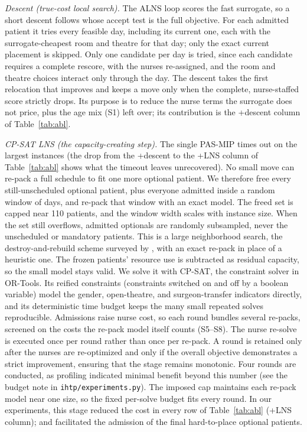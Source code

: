 \documentclass[11pt]{article}
\newcommand{\Sc}[1]{\textsf{S#1}}
\begin{document}
	\emph{Descent (true-cost local search).} The ALNS loop scores the fast surrogate, so a short
	descent follows whose accept test is the full objective. For each admitted patient it tries every feasible day, including its current one, each with the
	surrogate-cheapest room and theatre for that day; only the exact current placement is skipped. Only one candidate per day is tried, since each candidate requires a complete
	rescore, with the nurses re-assigned, and the room and theatre choices interact only through the day. The descent takes the
	first relocation that improves and keeps a move only when the complete, nurse-staffed score
	strictly drops. Its purpose is to reduce the nurse terms the surrogate does not price, plus the age mix (\Sc1) left over; its contribution is the +descent column of Table~\ref{tab:abl}.
	
	\emph{CP-SAT LNS (the capacity-creating step).} The single PAS-MIP times out on the largest
	instances (the drop from the +descent to the +LNS column of Table~\ref{tab:abl} shows what the timeout leaves unrecovered). No small move can re-pack a full schedule to fit one more optional patient. We
	therefore free every still-unscheduled optional patient, plus everyone admitted inside a random
	window of days, and re-pack that window with an exact model. The freed set is capped near 110 patients, and the window width scales with instance size. When the set still overflows, admitted optionals are randomly subsampled, never the unscheduled or mandatory patients. This is a large neighborhood search, the
	destroy-and-rebuild scheme surveyed by \citet{pisinger2010}, with an exact re-pack in place of a
	heuristic one. The frozen patients' resource use is subtracted as
	residual capacity, so the small model stays valid. We solve it with CP-SAT, the constraint solver
	in OR-Tools. Its reified constraints (constraints switched on and off by a boolean variable) model the
	gender, open-theatre, and surgeon-transfer indicators directly, and its deterministic time budget keeps the many small repeated solves reproducible. Admissions raise nurse cost, so each round bundles several re-packs, screened on the costs the re-pack model itself counts (\Sc5--\Sc8). The nurse re-solve is executed once per round rather than once per re-pack.
	A round is retained only after the nurses are re-optimized and only if the overall objective demonstrates a strict improvement, ensuring that the stage remains monotonic. Four rounds are conducted, as profiling indicated minimal benefit beyond this number (see the budget note in \texttt{ihtp/experiments.py}). The imposed cap maintains each re-pack model near one size, so the fixed per-solve budget fits every round. In our experiments, this stage reduced the cost in every row of Table~\ref{tab:abl} (+LNS column); and facilitated the admission of the final hard-to-place optional patients.
	
\end{document}
